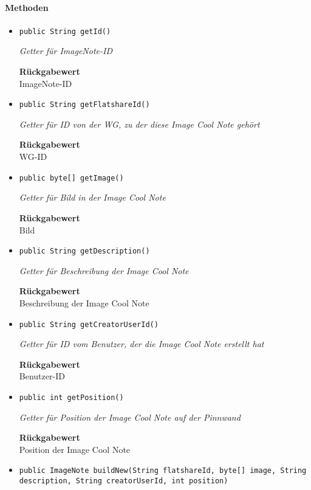     \paragraph*{Methoden}
    \begin{itemize}
    	\item{\texttt{public String getId()}}
    	
    	\textit{Getter für ImageNote-ID}
    	
    	
    	
    	\textbf{Rückgabewert} \\
    	ImageNote-ID        \item{\texttt{public String getFlatshareId()}}
    	
    	\textit{Getter für ID von der WG, zu der diese Image Cool Note gehört}
    	
    	
    	
    	\textbf{Rückgabewert} \\
    	WG-ID        \item{\texttt{public byte[] getImage()}}
    	
    	\textit{Getter für Bild in der Image Cool Note}
    	
    	
    	
    	\textbf{Rückgabewert} \\
    	Bild        \item{\texttt{public String getDescription()}}
    	
    	\textit{Getter für Beschreibung der Image Cool Note}
    	
    	
    	
    	\textbf{Rückgabewert} \\
    	Beschreibung der Image Cool Note        \item{\texttt{public String getCreatorUserId()}}
    	
    	\textit{Getter für ID vom Benutzer, der die Image Cool Note erstellt hat}
    	
    	
    	
    	\textbf{Rückgabewert} \\
    	Benutzer-ID        \item{\texttt{public int getPosition()}}
    	
    	\textit{Getter für Position der Image Cool Note auf der Pinnwand}
    	
    	
    	
    	\textbf{Rückgabewert} \\
    	Position der Image Cool Note        \item{\texttt{public ImageNote buildNew(String flatshareId, byte[] image, String description, String creatorUserId, int position)}}
    	

\end{itemize}
